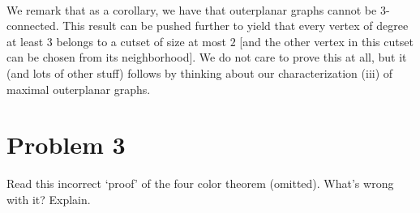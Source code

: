 \documentclass[10pt,a4paper]{article}
\newcommand{\1}{\mathbf{1}}
\begin{document}
\paragraph*{}We remark that as a corollary, we have that outerplanar graphs cannot be $3$-connected.  This result can be pushed further to yield that every vertex of degree at least $3$ belongs to a cutset of size at most $2$ [and the other vertex in this cutset can be chosen from its neighborhood].  We do not care to prove this at all, but it (and lots of other stuff) follows by thinking about our characterization (iii) of maximal outerplanar graphs.


\label{pr:2:end}


\section*{Problem 3}\label{pr:3:start}
Read this incorrect `proof' of the four color theorem (omitted).  What's wrong with it?  Explain.
\end{document}
